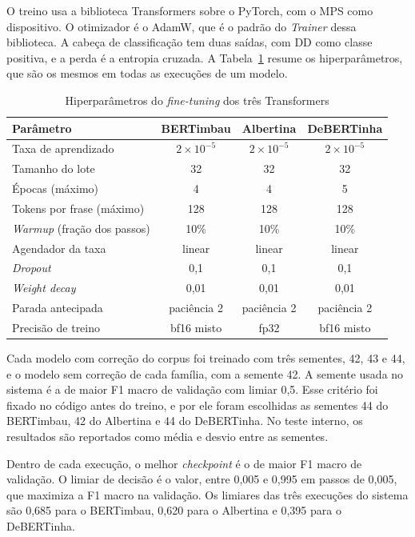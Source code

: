 \documentclass[
    12pt,                %
    openright,           %
    oneside,             %
    a4paper,             %
    english,             %
    brazil               %
]{abntex2}
\begin{document}
O treino usa a biblioteca Transformers sobre o PyTorch, com o MPS como dispositivo. O otimizador é o AdamW, que é o padrão do \textit{Trainer} dessa biblioteca. A cabeça de classificação tem duas saídas, com DD como classe positiva, e a perda é a entropia cruzada. A Tabela~\ref{tab:hiperparametros} resume os hiperparâmetros, que são os mesmos em todas as execuções de um modelo.

\begin{table}[htb]
    \centering
    \caption{Hiperparâmetros do \textit{fine-tuning} dos três Transformers}
    \label{tab:hiperparametros}
    \begin{tabular}{lccc}
        \toprule
        \textbf{Parâmetro} & \textbf{BERTimbau} & \textbf{Albertina} & \textbf{DeBERTinha} \\
        \midrule
        Taxa de aprendizado & $2 \times 10^{-5}$ & $2 \times 10^{-5}$ & $2 \times 10^{-5}$ \\
        Tamanho do lote & 32 & 32 & 32 \\
        Épocas (máximo) & 4 & 4 & 5 \\
        Tokens por frase (máximo) & 128 & 128 & 128 \\
        \textit{Warmup} (fração dos passos) & 10\% & 10\% & 10\% \\
        Agendador da taxa & linear & linear & linear \\
        \textit{Dropout} & 0,1 & 0,1 & 0,1 \\
        \textit{Weight decay} & 0,01 & 0,01 & 0,01 \\
        Parada antecipada & paciência 2 & paciência 2 & paciência 2 \\
        Precisão de treino & bf16 misto & fp32 & bf16 misto \\
        \bottomrule
    \end{tabular}
\end{table}

Cada modelo com correção do corpus foi treinado com três sementes, 42, 43 e 44, e o modelo sem correção de cada família, com a semente 42. A semente usada no sistema é a de maior F1 macro de validação com limiar 0,5. Esse critério foi fixado no código antes do treino, e por ele foram escolhidas as sementes 44 do BERTimbau, 42 do Albertina e 44 do DeBERTinha. No teste interno, os resultados são reportados como média e desvio entre as sementes.

Dentro de cada execução, o melhor \textit{checkpoint} é o de maior F1 macro de validação. O limiar de decisão é o valor, entre 0,005 e 0,995 em passos de 0,005, que maximiza a F1 macro na validação. Os limiares das três execuções do sistema são 0,685 para o BERTimbau, 0,620 para o Albertina e 0,395 para o DeBERTinha.
\end{document}
